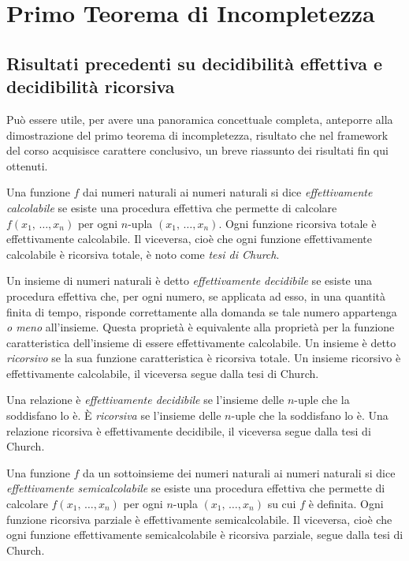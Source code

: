 
\chapter{Primo Teorema di Incompletezza}

\section{Risultati precedenti su decidibilit\`a effettiva
e decidibilit\`a ricorsiva}

	Pu\`o essere utile, per avere una panoramica concettuale
	completa, anteporre alla dimostrazione del primo teorema di
	incompletezza, risultato che nel framework del corso acquisisce carattere
	conclusivo, un breve riassunto dei risultati fin qui ottenuti.
	
	Una funzione $f$ dai numeri naturali ai numeri naturali si dice
	\textit{\emph{effettivamente} \emph{calcolabile}}
	se esiste una procedura
	effettiva che permette di calcolare $f(x_1,\,\dots,x_n)$ per ogni
	$n$-upla $(x_1,\,\dots,x_n)$. 	
	Ogni funzione ricorsiva totale \`e effettivamente calcolabile. Il viceversa,
	cio\`e che ogni funzione effettivamente calcolabile
	\`e ricorsiva totale, \`e noto
	come \textit{\emph{tesi di Church}}.
	
	Un insieme di numeri naturali \`e detto \emph{\textit{effettivamente
	decidibile}} se esiste una procedura effettiva che, per ogni
	numero, se applicata ad esso, in una quantit\`a
	finita di tempo, risponde correttamente
	alla domanda se tale numero appartenga \textit{o meno} all'insieme.
	Questa propriet\`a \`e equivalente alla propriet\`a per la funzione caratteristica
	dell'insieme di essere effettivamente calcolabile.
	Un insieme \`e detto \emph{\textit{ricorsivo}} se la sua funzione
	caratteristica \`e ricorsiva totale.
	Un insieme ricorsivo \`e effettivamente calcolabile, il viceversa segue dalla
	tesi di Church.
	
	Una relazione \`e \textit{\emph{effettivamente decidibile}} se l'insieme
	delle $n$-uple che la soddisfano lo \`e. \`E \textit{\emph{ricorsiva}}
	se l'insieme delle $n$-uple che la soddisfano lo \`e. Una relazione
	ricorsiva \`e effettivamente decidibile, il viceversa segue dalla tesi di
	Church.
	
	Una funzione $f$ da un sottoinsieme dei 
	numeri naturali ai numeri naturali si dice
	\textit{\emph{effettivamente semicalcolabile}}
	se esiste una procedura effettiva che permette di calcolare
	$f(x_1,\,\dots,x_n)$ per ogni $n$-upla $(x_1,\,\dots,x_n)$ su cui
	$f$ \`e definita.
	Ogni funzione ricorsiva parziale \`e effettivamente semicalcolabile.
	Il viceversa, 	cio\`e che ogni funzione effettivamente semicalcolabile
	\`e ricorsiva parziale, segue dalla tesi di Church.
	
